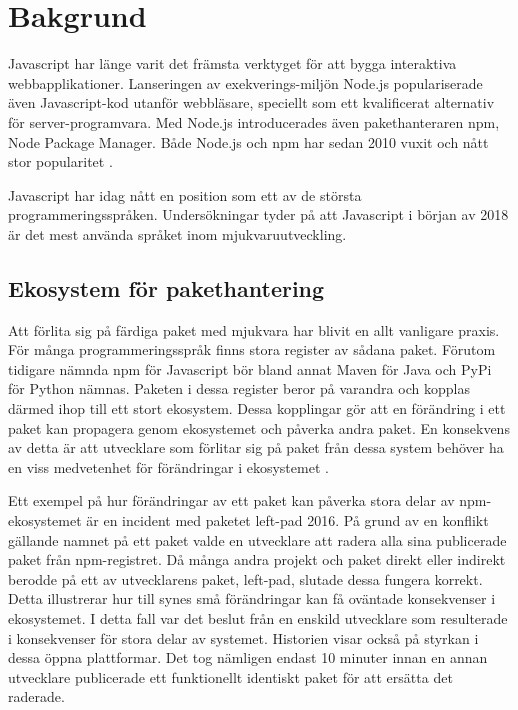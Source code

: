\section{Bakgrund}
\label{sec:joel_o-background}

Javascript har länge varit det främsta verktyget för att bygga interaktiva webbapplikationer. Lanseringen av exekverings-miljön Node.js \cite{node-about} populariserade även Javascript-kod utanför webbläsare, speciellt som ett kvalificerat alternativ för server-programvara. Med Node.js introducerades även pakethanteraren npm, Node Package Manager. Både Node.js och npm har sedan 2010 vuxit och nått stor popularitet \cite{node-timeline}.

Javascript har idag nått en position som ett av de största programmeringsspråken. Undersökningar tyder på att Javascript i början av 2018 är det mest använda språket inom mjukvaruutveckling. \cite{githut, so-survey}

\subsection{Ekosystem för pakethantering}
Att förlita sig på färdiga paket med mjukvara har blivit en allt vanligare praxis. För många programmeringsspråk finns stora register av sådana paket. Förutom tidigare nämnda npm för Javascript bör bland annat Maven för Java och PyPi för Python nämnas. Paketen i dessa register beror på varandra och kopplas därmed ihop till ett stort ekosystem. Dessa kopplingar gör att en förändring i ett paket kan propagera genom ekosystemet och påverka andra paket. En konsekvens av detta är att utvecklare som förlitar sig på paket från dessa system behöver ha en viss medvetenhet för förändringar i ekosystemet \cite{Henry2017}.

Ett exempel på hur förändringar av ett paket kan påverka stora delar av npm-ekosystemet är en incident med paketet left-pad 2016. På grund av en konflikt gällande namnet på ett paket valde en utvecklare att radera alla sina publicerade paket från npm-registret. Då många andra projekt och paket direkt eller indirekt berodde på ett av utvecklarens paket, left-pad, slutade dessa fungera korrekt. Detta illustrerar hur till synes små förändringar kan få oväntade konsekvenser i ekosystemet. I detta fall var det beslut från en enskild utvecklare som resulterade i konsekvenser för stora delar av systemet. Historien visar också på styrkan i dessa öppna plattformar. Det tog nämligen endast 10 minuter innan en annan utvecklare publicerade ett funktionellt identiskt paket för att ersätta det raderade. \cite{npm-left-pad}


